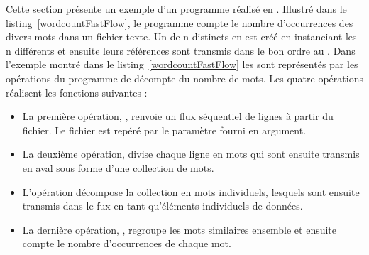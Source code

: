 Cette section pr\'esente un exemple d'un programme r\'ealis\'e en . Illustr\'e dans le listing~\ref{wordcountFastFlow}, le programme compte le nombre d'occurrences des divers mots dans un fichier texte. Un  de n  distincts en  est cr\'e\'e en instanciant les n diff\'erents  et ensuite leurs r\'ef\'erences sont transmis dans le bon ordre au . Dans l'exemple montr\'e dans le listing~\ref{wordcountFastFlow} les  sont repr\'esent\'es par les op\'erations du programme de d\'ecompte du nombre de mots. Les quatre op\'erations r\'ealisent les fonctions suivantes :

\begin{itemize}
	\item La premi\`ere op\'eration, , renvoie un flux s\'equentiel de lignes \`a partir du fichier. Le fichier est rep\'er\'e par le param\`etre  fourni en argument.

	\item La deuxi\`eme op\'eration,  divise chaque ligne en mots qui sont ensuite transmis en aval sous forme d'une collection de mots.
	
	\item L'op\'eration  décompose la collection en mots individuels, lesquels sont ensuite transmis dans le fux en tant qu'éléments individuels de données.
	
	\item La derni\`ere op\'eration, , regroupe les mots similaires ensemble et ensuite compte le nombre d'occurrences de chaque mot.
	
\end{itemize}
